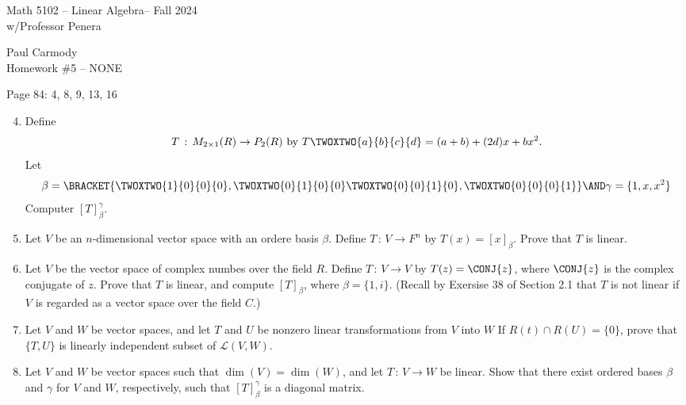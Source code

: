 \documentclass[10pt,a4paper]{report}
\newcommand{\CLASSNAME}{Math 5102 -- Linear Algebra}
\newcommand{\STUDENTNAME}{Paul Carmody}
\newcommand{\ASSIGNMENT}{Homework \#5 }
\newcommand{\DUEDATE}{NONE}
\newcommand{\SEMESTER}{Fall 2024}
\begin{document}
\begin{center}
	\Large{\CLASSNAME -- \SEMESTER} \\
	\large{ w/Professor Penera}
\end{center}
\begin{center}
	\STUDENTNAME \\
	\ASSIGNMENT -- \DUEDATE\\
\end{center} 
Page 84: 4, 8, 9, 13, 16
\begin{enumerate}
	\setcounter{enumi}{3}
	\item Define
	\begin{align*}
		T\,:\, M_{2\times 1}(R)\to P_2(R)\text{ by } T\TWOXTWO{a}{b}{c}{d}=(a+b)+(2d)x+bx^2.
	\end{align*}Let
	\begin{align*}
		\beta =\BRACKET{\TWOXTWO{1}{0}{0}{0}, \TWOXTWO{0}{1}{0}{0}\TWOXTWO{0}{0}{1}{0},\TWOXTWO{0}{0}{0}{1}} \AND \gamma = \{1,x,x^2\}
	\end{align*}Computer $[T]_\beta^\gamma$.
	\setcounter{enumi}{7}
	\item Let $V$ be an $n$-dimensional vector space with an ordere basis $\beta$.  Define $T\,:\,V \to F^n$ by $T(x)=[x]_\beta$.  Prove that $T$ is linear.
	\item Let $V$ be the vector space of complex numbes over the field $R$.  Define $T\,:\,V \to V$ by $T(z)=\CONJ{z}$, where $\CONJ{z}$ is the complex conjugate of $z$.  Prove that $T$ is linear, and compute $[T]_\beta$, where $\beta=\{1,i\}$.  (Recall by Exersise 38 of Section 2.1 that $T$ is not linear if $V$ is regarded as a vector space over the field $C$.)
	\setcounter{enumi}{12}
	\item Let $V$ and $W$ be vector spaces, and let $T$ and $U$ be nonzero linear transformations from $V$ into $W$  If $R(t) \cap R(U) = \{0\}$, prove that $\{T,U\}$ is linearly independent subset of $\mathcal{L}(V,W)$.
	\setcounter{enumi}{15}
	\item Let $V$ and $W$ be vector spaces such that $\dim(V)=\dim (W)$, and let $T\,:\,V \to W$ be linear.  Show that there exist ordered bases $\beta$ and $\gamma$ for $V$ and $W$, respectively, such that $[T]_\beta^\gamma$ is a diagonal matrix.
\end{enumerate}
\end{document}
